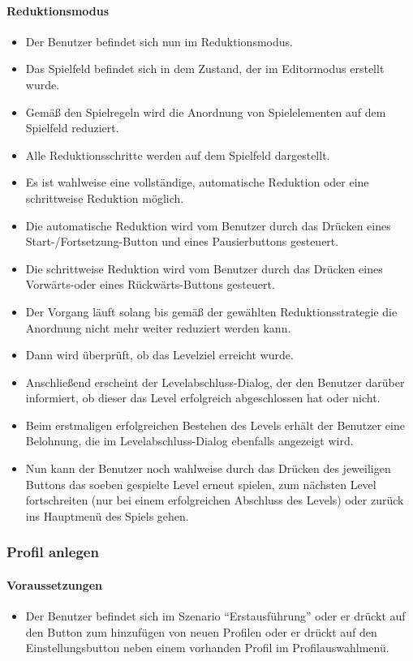 \paragraph{Reduktionsmodus}
\begin{itemize}
	\item Der Benutzer befindet sich nun im Reduktionsmodus.
	\item Das Spielfeld befindet sich in dem Zustand, der im Editormodus erstellt wurde.
	\item Gemäß den Spielregeln wird die Anordnung von Spielelementen auf dem Spielfeld reduziert.
	\item Alle Reduktionsschritte werden auf dem Spielfeld dargestellt.
	\item Es ist wahlweise eine vollständige, automatische Reduktion oder eine schrittweise Reduktion möglich.
	\item Die automatische Reduktion wird vom Benutzer durch das Drücken eines Start-/Fortsetzung-Button und eines Pausierbuttons gesteuert.
	\item Die schrittweise Reduktion wird vom Benutzer durch das Drücken eines Vorwärts-oder eines Rückwärts-Buttons gesteuert.
	\item Der Vorgang läuft solang bis gemäß der gewählten Reduktionsstrategie die Anordnung nicht mehr weiter reduziert werden kann.
	\item Dann wird überprüft, ob das Levelziel erreicht wurde.
	\item Anschließend erscheint der Levelabschluss-Dialog, der den Benutzer darüber informiert, ob dieser das Level erfolgreich abgeschlossen hat oder nicht.
	\item Beim erstmaligen erfolgreichen Bestehen des Levels erhält der Benutzer eine Belohnung, die im Levelabschluss-Dialog ebenfalls angezeigt wird.
	\item Nun kann der Benutzer noch wahlweise durch das Drücken des jeweiligen Buttons das soeben gespielte Level erneut spielen, zum nächsten Level fortschreiten (nur bei einem erfolgreichen Abschluss des Levels) oder zurück ins Hauptmenü des Spiels gehen.
\end{itemize}

\subsubsection{Profil anlegen}
\paragraph{Voraussetzungen}
\begin{itemize}
	\item Der Benutzer befindet sich im Szenario "`Erstausführung"' oder er drückt auf den Button zum hinzufügen von neuen Profilen oder er drückt auf den Einstellungsbutton neben einem vorhanden Profil im Profilauswahlmenü.
\end{itemize}
